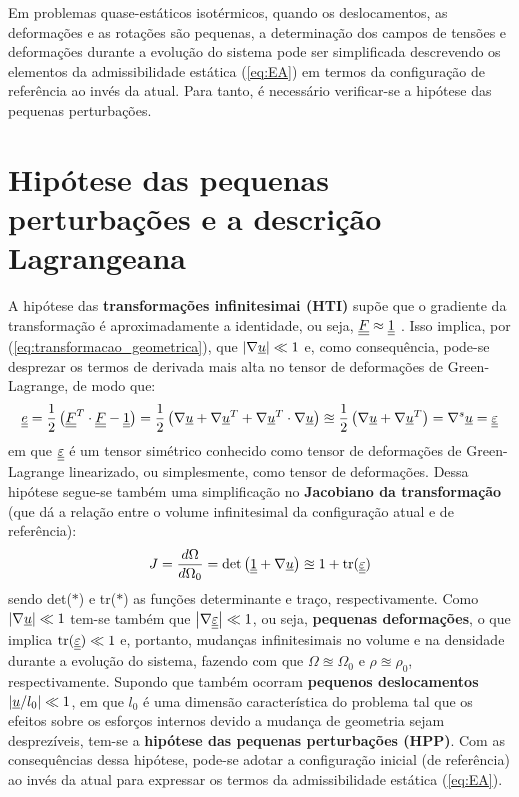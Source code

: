 Em problemas quase-estáticos isotérmicos, quando os deslocamentos, as deformações e as rotações são pequenas, a determinação dos campos de tensões e deformações durante a evolução do sistema pode ser simplificada descrevendo os elementos da admissibilidade estática (\ref{eq:EA}) em termos da configuração de referência ao invés da atual. Para tanto, é necessário verificar-se a hipótese das pequenas perturbações.

\section{Hipótese das pequenas perturbações e a descrição Lagrangeana}

A hipótese das \textbf{transformações infinitesimai (HTI)} supõe que o gradiente da transformação é aproximadamente a identidade, ou seja, $\underline{\underline F} \approx \underline{\underline 1}$ . Isso implica, por (\ref{eq:transformacao_geometrica}), que $\left| \nabla \underline u \right| \ll 1$ e, como consequência, pode-se desprezar os termos de derivada mais alta no tensor de deformações de Green-Lagrange, de modo que:
\begin{equation}
	\label{eq:green_lagrange_linearizado}
	\underline{\underline e} = \frac{1}{2} \left(\underline{\underline F}^T \cdot \underline{\underline F} - \underline{\underline 1} \right) = \frac{1}{2} \left(\nabla \underline u + \nabla\underline u^T + \nabla\underline u^T \cdot \nabla \underline u \right) \approxeq \frac{1}{2} \left(\nabla \underline u + \nabla\underline u^T \right) = \nabla^s\underline u = \underline{\underline \varepsilon}
\end{equation}
em que $\underline{\underline \varepsilon}$ é um tensor simétrico conhecido como tensor de deformações de Green-Lagrange linearizado, ou simplesmente, como tensor de deformações. Dessa hipótese segue-se também uma simplificação no \textbf{Jacobiano da transformação} (que dá a relação entre o volume infinitesimal da configuração atual e de referência):
\begin{equation}
	\label{eq:jacobiano}
	J = \frac{d\Omega}{d\Omega_0} = \text{det}\left(\underline{\underline 1} + \nabla \underline u \right) \approxeq 1 + \text{tr}(\underline{\underline \varepsilon})
\end{equation}
sendo det($*$) e tr($*$) as funções determinante e traço, respectivamente. Como  $\left| \nabla \underline u \right| \ll 1$ tem-se também que $\left| \nabla \underline{\underline \varepsilon} \right| \ll 1$, ou seja, \textbf{pequenas deformações}, o que implica $\text{tr}(\underline{\underline \varepsilon}) \ll 1$ e, portanto, mudanças infinitesimais no volume e na densidade durante a evolução do sistema, fazendo com que $\Omega \approxeq \Omega_0$ e $\rho \approxeq \rho_0$, respectivamente. Supondo que também ocorram \textbf{pequenos deslocamentos} $\left| \underline u / l_0 \right| \ll 1$, em que $l_0$ é uma dimensão característica do problema tal que os efeitos sobre os esforços internos devido a mudança de geometria sejam desprezíveis, tem-se a \textbf{hipótese das pequenas perturbações (HPP)}. Com as consequências dessa hipótese, pode-se adotar a configuração inicial (de referência) ao invés da atual para expressar os termos da admissibilidade estática  (\ref{eq:EA}).


